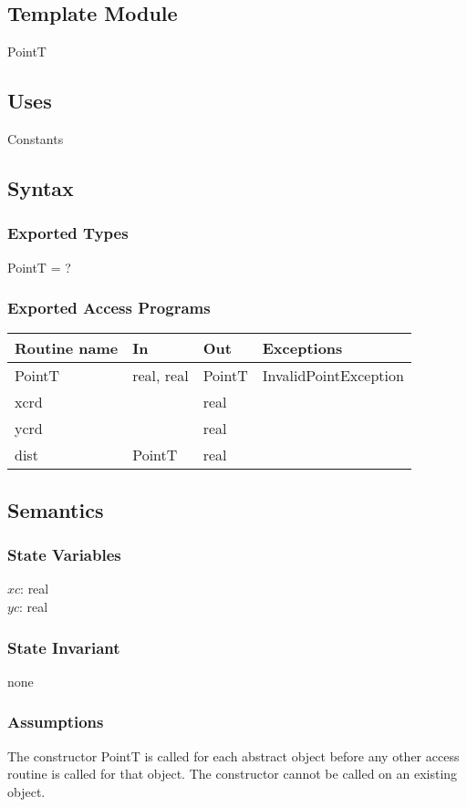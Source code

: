 \documentclass[12pt]{article}
\begin{document}
\subsection*{Template Module}
PointT
\subsection* {Uses}
Constants
\subsection* {Syntax}
\subsubsection* {Exported Types}
PointT = ?
\subsubsection* {Exported Access Programs}
\begin{tabular}{| l | l | l | l |}
\hline
\textbf{Routine name} & \textbf{In} & \textbf{Out} & \textbf{Exceptions}\\
\hline
PointT & real, real & PointT & InvalidPointException\\
\hline
xcrd & ~ & real & ~\\
\hline
ycrd & ~ & real & ~\\
\hline
dist & PointT & real & ~\\
\hline
\end{tabular}
\subsection* {Semantics}
\subsubsection* {State Variables}
$xc$: real\\
$yc$: real
\subsubsection* {State Invariant}
none
\subsubsection* {Assumptions}
The constructor PointT is called for each abstract object before any other access routine is called for that
object.  The constructor cannot be called on an existing object.
\end{document}
